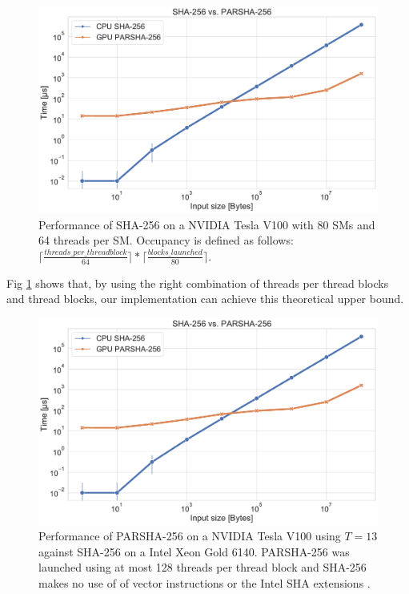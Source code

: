 \documentclass[letterpaper]{article}
\begin{document}
\begin{figure}[h]\centering
\includegraphics[scale=0.23]{plot_parsha.pdf}
  \caption{Performance of SHA-256 on a NVIDIA Tesla V100 with 80 SMs and 64 threads per SM. Occupancy is defined as follows: $\lceil \frac{threads\_per\_threadblock}{ 64} \rceil * \lceil \frac{blocks\_launched}{  80} \rceil$.   \label{fig:sha256}}
\end{figure}
 
Fig \ref{fig:sha256} shows that, by using the right combination of threads per thread blocks and thread blocks, our implementation can achieve this theoretical upper bound.


\begin{figure}[h]\centering
\includegraphics[scale=0.23]{plot_parsha.pdf}
  \caption{Performance of PARSHA-256 on a NVIDIA Tesla V100 using $T = 13$  against SHA-256 on a Intel Xeon Gold 6140. PARSHA-256 was launched using at most 128 threads per thread block and SHA-256 makes no use of  of vector instructions or the Intel SHA extensions \cite{SHA_Extensions}.   \label{fig:parsha256}}
\end{figure}
\end{document}
